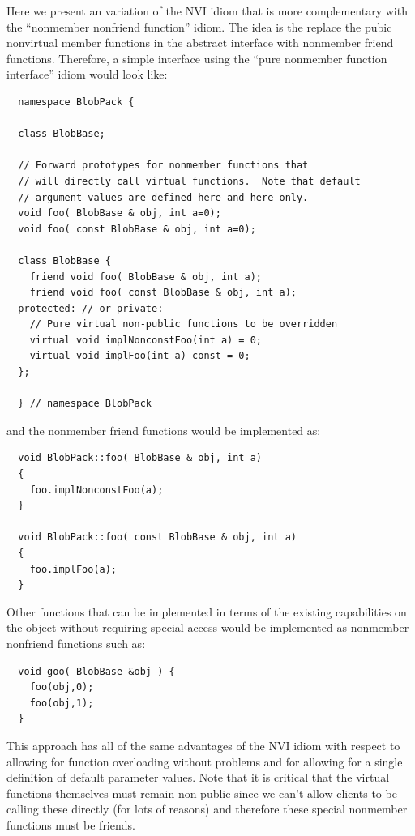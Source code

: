 \documentclass[pdf,ps2pdf,11pt]{SANDreport}
\begin{document}
Here we present an variation of the NVI idiom that is more complementary with
the ``nonmember nonfriend function'' idiom.  The idea is the replace the pubic
nonvirtual member functions in the abstract interface with nonmember friend
functions.  Therefore, a simple interface using the ``pure nonmember function
interface'' idiom would look like:

{\small\begin{verbatim}
  namespace BlobPack {

  class BlobBase;

  // Forward prototypes for nonmember functions that
  // will directly call virtual functions.  Note that default
  // argument values are defined here and here only.
  void foo( BlobBase & obj, int a=0);
  void foo( const BlobBase & obj, int a=0);

  class BlobBase {
    friend void foo( BlobBase & obj, int a);
    friend void foo( const BlobBase & obj, int a);
  protected: // or private:
    // Pure virtual non-public functions to be overridden
    virtual void implNonconstFoo(int a) = 0;
    virtual void implFoo(int a) const = 0;
  };

  } // namespace BlobPack
\end{verbatim}}

{}\noindent{}and the nonmember friend functions would be implemented as:

{\small\begin{verbatim}
  void BlobPack::foo( BlobBase & obj, int a)
  {
    foo.implNonconstFoo(a);
  }

  void BlobPack::foo( const BlobBase & obj, int a)
  {
    foo.implFoo(a);
  }
\end{verbatim}}

Other functions that can be implemented in terms of the existing capabilities
on the object without requiring special access would be implemented as
nonmember nonfriend functions such as:

{\small\begin{verbatim}
  void goo( BlobBase &obj ) {
    foo(obj,0);
    foo(obj,1);
  }
\end{verbatim}}

This approach has all of the same advantages of the NVI idiom with respect to
allowing for function overloading without problems and for allowing
for a single definition of default parameter values.  Note that it is critical
that the virtual functions themselves must remain non-public since we can't
allow clients to be calling these directly (for lots of reasons) and therefore
these special nonmember functions must be friends.
\end{document}
